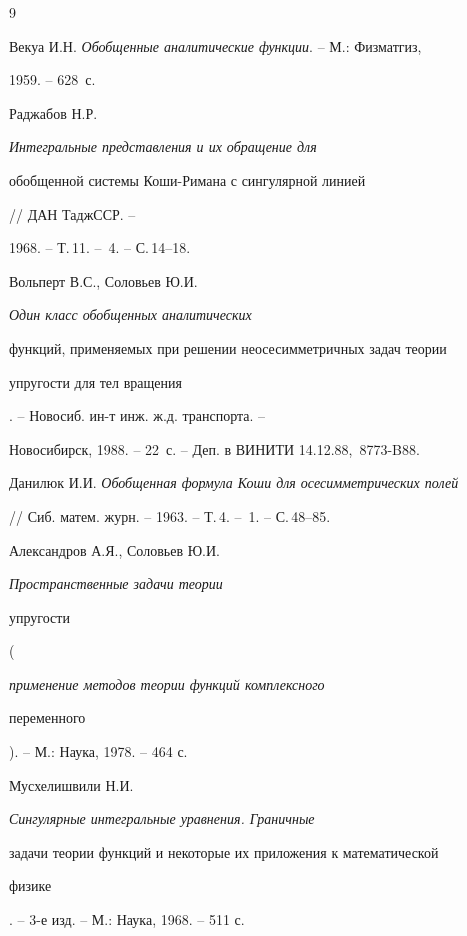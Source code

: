\begin{thebibliography}{9}  


 




Векуа И.Н. {\em Обобщенные аналитические функции}. -- М.: Физматгиз, 


1959. -- 628~с. 




Раджабов Н.Р. {\em Интегральные представления и их обращение для 


обобщенной системы Коши-Римана с сингулярной линией} // ДАН ТаджССР. -- 


1968. -- Т.\,11. -- \No\,4. -- С.\,14--18. 




Вольперт В.С., Соловьев Ю.И. {\em Один класс обобщенных аналитических 


функций, применяемых при решении неосесимметричных задач теории 


упругости для тел вращения}. -- Новосиб. ин-т инж. ж.д. транспорта. -- 


Новосибирск, 1988. -- 22~с. -- Деп. в ВИНИТИ 14.12.88, \No\,8773-B88. 




Данилюк И.И. {\em Обобщенная формула Коши для осесимметрических полей} 


// Сиб. матем. журн. -- 1963. -- Т.\,4. -- \No\,1. -- С.\,48--85. 




Александров А.Я., Соловьев Ю.И. {\em Пространственные задачи теории 


упругости} ({\em применение методов теории функций комплексного 


переменного}). -- М.: Наука, 1978. -- 464 с. 




Мусхелишвили Н.И. {\em Сингулярные интегральные уравнения. Граничные 


задачи теории функций и некоторые их приложения к математической 


физике}. -- 3-е изд. -- М.: Наука, 1968. -- 511 с. 


 


\end{thebibliography}  


  


\vskip 2cm  


  






 


  


